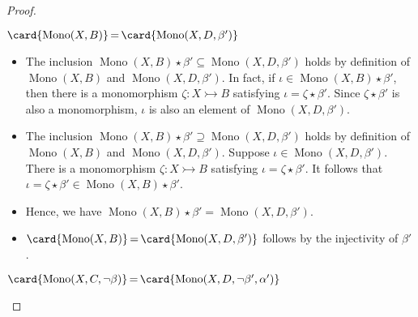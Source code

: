     \begin{proof}
        \label{proof:dcomp_w_u}
    \begin{claim}
        $\card{\operatorname{Mono}(X, B)} \mathop{=} \card{\operatorname{Mono}(X, D, \beta')}$
    \end{claim}
    \begin{itemize} 
        \item The inclusion \(\operatorname{Mono}(X, B) \mathop{\star} \beta' \mathop{\subseteq} \operatorname{Mono}(X, D, \beta')\) holds by definition of $\operatorname{Mono}(X, B)$ and $\operatorname{Mono}(X, D, \beta')$. 
        In fact, if \(\iota  \mathop{\in} \operatorname{Mono}(X, B) \mathop{\star} \beta' \), then there is a monomorphism \(\zeta : X \rightarrowtail B\) satisfying \(\iota \mathop{=} \zeta \mathop{\star} \beta'\). Since $\zeta \mathop{\star} \beta'$ is also a monomorphism, \(\iota\) is also an element of \(\operatorname{Mono}(X, D, \beta')\).
        \item The inclusion \(\operatorname{Mono}(X, B) \mathop{\star} \beta' \supseteq \operatorname{Mono}(X, D, \beta')\) holds by definition of $\operatorname{Mono}(X, B)$ and $\operatorname{Mono}(X, D, \beta')$.
        Suppose \(\iota \mathop{\in} \operatorname{Mono}(X, D, \beta')\). There is a monomorphism \(\zeta : X \rightarrowtail B\) satisfying \(\iota \mathop{=} \zeta \mathop{\star} \beta'\). It follows that \(\iota \mathop{=} \zeta \mathop{\star} \beta' \mathop{\in} \operatorname{Mono}(X, B) \mathop{\star} \beta'\).
        \item Hence, we have \(\operatorname{Mono}(X, B) \mathop{\star} \beta' \mathop{=} \operatorname{Mono}(X, D, \beta')\).
        \item $\card{\operatorname{Mono}(X, B)} \mathop{=} \card{\operatorname{Mono}(X, D, \beta')}$ follows by the injectivity of $\beta'$.
    \end{itemize}
    \begin{claim}
         $\card{\operatorname{Mono}(X, C, \lnot \beta)} \mathop{=} \card{\operatorname{Mono}(X, D, \lnot \beta', \alpha')}$
       \end{claim}
        \begin{itemize}

\end{itemize}
\end{proof}
